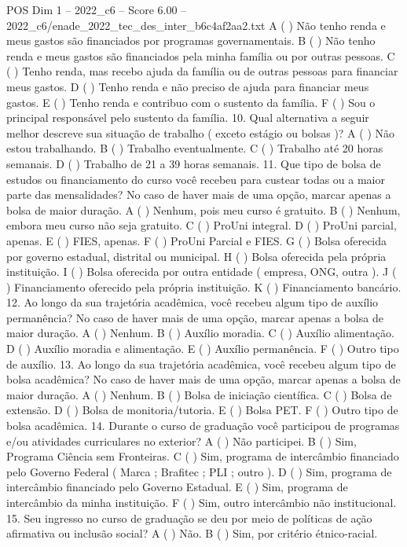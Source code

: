 \begin{textsample}{POS Dim 1 – 2022\_c6 – Score 6.00 – 2022\_c6/enade\_2022\_tec\_des\_inter\_b6c4af2aa2.txt}
A ( ) Não tenho renda e meus gastos são financiados por programas governamentais.
B ( ) Não tenho renda e meus gastos são financiados pela minha família ou por outras pessoas.
C ( ) Tenho renda, mas recebo ajuda da família ou de outras pessoas para financiar meus gastos.
D ( ) Tenho renda e não preciso de ajuda para financiar meus gastos.
E ( ) Tenho renda e contribuo com o sustento da família.
F ( ) Sou o principal responsável pelo sustento da família. 10.
Qual alternativa a seguir melhor descreve sua situação de trabalho ( exceto estágio ou bolsas )?
A ( ) Não estou trabalhando.
B ( ) Trabalho eventualmente.
C ( ) Trabalho até 20 horas semanais.
D ( ) Trabalho de 21 a 39 horas semanais. 11.
Que tipo de bolsa de estudos ou financiamento do curso você recebeu para custear todas ou a maior parte das mensalidades?
No caso de haver mais de uma opção, marcar apenas a bolsa de maior duração.
A ( ) Nenhum, pois meu curso é gratuito.
B ( ) Nenhum, embora meu curso não seja gratuito.
C ( ) ProUni integral.
D ( ) ProUni parcial, apenas.
E ( ) FIES, apenas.
F ( ) ProUni Parcial e FIES.
G ( ) Bolsa oferecida por governo estadual, distrital ou municipal.
H ( ) Bolsa oferecida pela própria instituição.
I ( ) Bolsa oferecida por outra entidade ( empresa, ONG, outra ).
J ( ) Financiamento oferecido pela própria instituição.
K ( ) Financiamento bancário. 12.
Ao longo da sua trajetória acadêmica, você recebeu algum tipo de auxílio permanência?
No caso de haver mais de uma opção, marcar apenas a bolsa de maior duração.
A ( ) Nenhum.
B ( ) Auxílio moradia.
C ( ) Auxílio alimentação.
D ( ) Auxílio moradia e alimentação.
E ( ) Auxílio permanência.
F ( ) Outro tipo de auxílio. 13.
Ao longo da sua trajetória acadêmica, você recebeu algum tipo de bolsa acadêmica?
No caso de haver mais de uma opção, marcar apenas a bolsa de maior duração.
A ( ) Nenhum.
B ( ) Bolsa de iniciação científica.
C ( ) Bolsa de extensão.
D ( ) Bolsa de monitoria/tutoria.
E ( ) Bolsa PET.
F ( ) Outro tipo de bolsa acadêmica. 14.
Durante o curso de graduação você participou de programas e/ou atividades curriculares no exterior?
A ( ) Não participei.
B ( ) Sim, Programa Ciência sem Fronteiras.
C ( ) Sim, programa de intercâmbio financiado pelo Governo Federal ( Marca ; Brafitec ; PLI ; outro ).
D ( ) Sim, programa de intercâmbio financiado pelo Governo Estadual.
E ( ) Sim, programa de intercâmbio da minha instituição.
F ( ) Sim, outro intercâmbio não institucional. 15.
Seu ingresso no curso de graduação se deu por meio de políticas de ação afirmativa ou inclusão social?
A ( ) Não.
B ( ) Sim, por critério étnico-racial.

\end{textsample}
